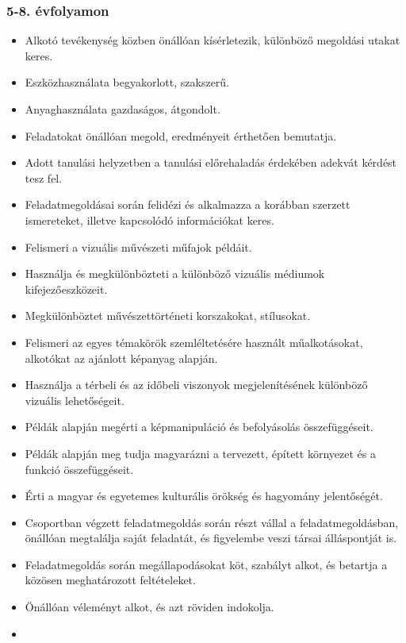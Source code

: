 \hypertarget{evfolyamon-39}{%
\subsubsection{5-8. évfolyamon}\label{evfolyamon-39}}

\begin{itemize}
\item
  Alkotó tevékenység közben önállóan kísérletezik, különböző megoldási
  utakat keres.
\item
  Eszközhasználata begyakorlott, szakszerű.
\item
  Anyaghasználata gazdaságos, átgondolt.
\item
  Feladatokat önállóan megold, eredményeit érthetően bemutatja.
\item
  Adott tanulási helyzetben a tanulási előrehaladás érdekében adekvát
  kérdést tesz fel.
\item
  Feladatmegoldásai során felidézi és alkalmazza a korábban szerzett
  ismereteket, illetve kapcsolódó információkat keres.
\item
  Felismeri a vizuális művészeti műfajok példáit.
\item
  Használja és megkülönbözteti a különböző vizuális médiumok
  kifejezőeszközeit.
\item
  Megkülönböztet művészettörténeti korszakokat, stílusokat.
\item
  Felismeri az egyes témakörök szemléltetésére használt műalkotásokat,
  alkotókat az ajánlott képanyag alapján.
\item
  Használja a térbeli és az időbeli viszonyok megjelenítésének különböző
  vizuális lehetőségeit.
\item
  Példák alapján megérti a képmanipuláció és befolyásolás
  összefüggéseit.
\item
  Példák alapján meg tudja magyarázni a tervezett, épített környezet és
  a funkció összefüggéseit.
\item
  Érti a magyar és egyetemes kulturális örökség és hagyomány
  jelentőségét.
\item
  Csoportban végzett feladatmegoldás során részt vállal a
  feladatmegoldásban, önállóan megtalálja saját feladatát, és figyelembe
  veszi társai álláspontját is.
\item
  Feladatmegoldás során megállapodásokat köt, szabályt alkot, és
  betartja a közösen meghatározott feltételeket.
\item
  Önállóan véleményt alkot, és azt röviden indokolja.
\item

\end{itemize}
